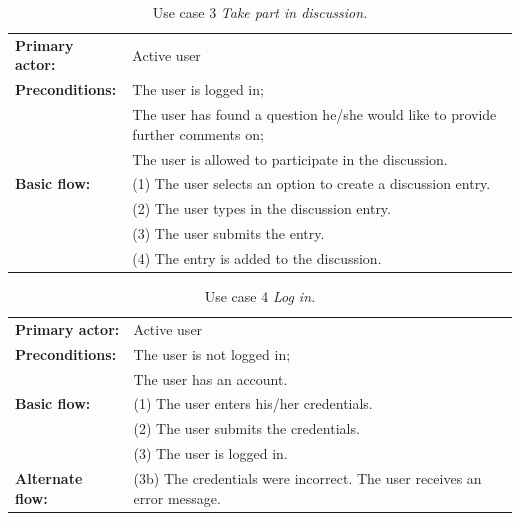 \begin{table}[ht]
\caption{Use case 3 \textit{Take part in discussion.}}
\begin{center}
	\begin{tabular}{ l p{300px} }
		\hline
		\textbf{Primary actor:}	& Active user \\

		\textbf{Preconditions:}	& The user is logged in; \\
														& The user has found a question he/she would like to provide further comments on; \\
														& The user is allowed to participate in the discussion.\\

		\textbf{Basic flow:}	& (1) The user selects an option to create a discussion entry. \\
													&	(2) The user types in the discussion entry.	\\
													& (3) The user submits the entry. \\
													& (4) The entry is added to the discussion. \\

		\hline
	\end{tabular}
\end{center}
\label{table:use_case3}
\end{table}



\begin{table}[ht]
\caption{Use case 4 \textit{Log in.}}
\begin{center}
	\begin{tabular}{ l p{300px} }
		\hline
		\textbf{Primary actor:}	& Active user \\

		\textbf{Preconditions:}		& The user is not logged in; \\
															& The user has an account.\\

		\textbf{Basic flow:}			& (1) The user enters his/her credentials. \\
															& (2) The user submits the credentials. \\
															& (3) The user is logged in. \\
		\textbf{Alternate flow:}	& (3b) The credentials were incorrect. The user receives an error message. \\
		\hline
	\end{tabular}
\end{center}
\label{table:use_case4}
\end{table}


